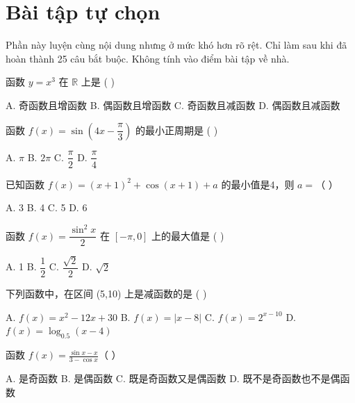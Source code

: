 \documentclass[11pt, a4paper]{article}
\begin{document}
\clearpage
\section{Bài tập tự chọn}

Phần này luyện cùng nội dung nhưng ở mức khó hơn rõ rệt. Chỉ làm sau khi đã hoàn thành 25 câu bắt buộc. Không tính vào điểm bài tập về nhà.

\begin{baitap}[1]
函数 $y = x^3$ 在 $\mathbb{R}$ 上是 ( )
\par\vspace{3pt}
\noindent A. 奇函数且增函数 \quad B. 偶函数且增函数 \quad C. 奇函数且减函数 \quad D. 偶函数且减函数
\end{baitap}

\begin{baitap}[2]
函数 $f(x) = \sin\!\left(4x - \dfrac{\pi}{3}\right)$ 的最小正周期是 ( )
\par\vspace{3pt}
\noindent A. $\pi$ \quad B. $2\pi$ \quad C. $\dfrac{\pi}{2}$ \quad D. $\dfrac{\pi}{4}$
\end{baitap}

\begin{baitap}[3]
已知函数 $f(x) = (x+1)^2 + \cos(x+1) + a$ 的最小值是4，则 $a =$（ ）
\par\vspace{3pt}
\noindent A. 3 \quad B. 4 \quad C. 5 \quad D. 6
\end{baitap}

\begin{baitap}[4]
函数 $f(x) = \dfrac{\sin^2 x}{2}$ 在 $[-\pi, 0]$ 上的最大值是 ( )
\par\vspace{3pt}
\noindent A. 1 \quad B. $\dfrac{1}{2}$ \quad C. $\dfrac{\sqrt{2}}{2}$ \quad D. $\sqrt{2}$
\end{baitap}

\begin{baitap}[5]
下列函数中，在区间 (5,10) 上是减函数的是 ( )
\par\vspace{3pt}
\noindent A. $f(x) = x^2 - 12x + 30$ \quad B. $f(x) = |x - 8|$ \quad C. $f(x) = 2^{x-10}$ \quad D. $f(x) = \log_{0.5}(x - 4)$
\end{baitap}

\begin{baitap}[6]
函数 $f(x)=\frac{\sin x-x}{3-\cos x}$（ ）
\par\vspace{3pt}
\noindent A. 是奇函数 \quad B. 是偶函数 \quad C. 既是奇函数又是偶函数 \quad D. 既不是奇函数也不是偶函数
\end{baitap}
\end{document}
